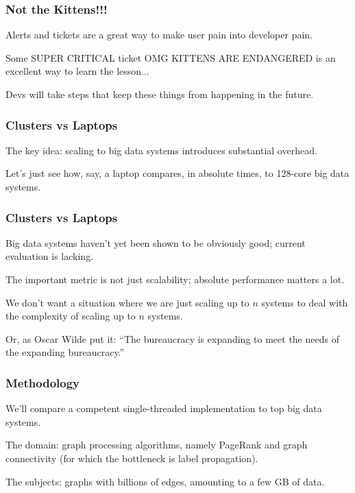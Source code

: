 \begin{frame}
\frametitle{Not the Kittens!!!}

Alerts and tickets are a great way to make user pain into developer pain.

Some SUPER CRITICAL ticket OMG KITTENS ARE ENDANGERED is an excellent way to learn the lesson... 

Devs will take steps that keep these things from happening in the future.

\end{frame}



\begin{frame}
\frametitle{Clusters vs Laptops}

The key idea: scaling to big data systems introduces substantial overhead. 

Let's just see how, say, a laptop compares, in absolute times, to 128-core big data systems.


\end{frame}



\begin{frame}
\frametitle{Clusters vs Laptops}

Big data systems haven't yet been shown to be obviously good; current evaluation is lacking.

The important metric is not just scalability; absolute
performance matters a lot. 

We don't want a situation where we are just scaling up to $n$ systems to deal with the complexity of scaling up to $n$ systems. 

Or, as Oscar Wilde put it: ``The bureaucracy is expanding to meet the needs of the expanding bureaucracy.''

\end{frame}



\begin{frame}
\frametitle{Methodology}

We'll compare a competent single-threaded implementation to top
big data systems. 

The domain: graph processing
algorithms, namely PageRank and graph connectivity (for which the bottleneck is label propagation). 

The subjects: graphs with billions of edges, amounting to a few
GB of data.


\end{frame}



